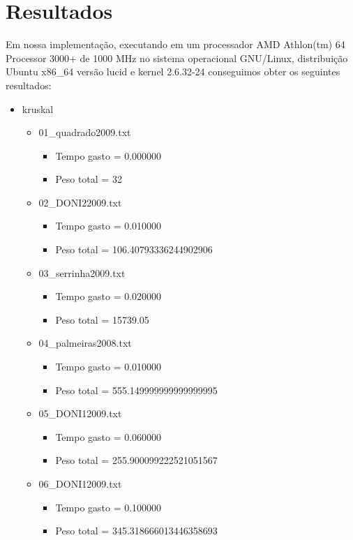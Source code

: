\documentclass[12pt,a4paper]{article}
\begin{document}
\section{Resultados}

Em nossa implementação, executando em um processador AMD Athlon(tm) 64 Processor
3000+ de 1000 MHz no sistema operacional GNU/Linux, distribuição Ubuntu x86\_64
versão lucid e kernel 2.6.32-24 conseguimos obter os seguintes resultados:

\begin{itemize}
\item kruskal
\begin{itemize}
\item 01\_quadrado2009.txt
\begin{itemize}
\item Tempo gasto = 0.000000 
\item Peso total = 32
\end{itemize}
\item 02\_DONI22009.txt
\begin{itemize}
\item Tempo gasto = 0.010000 
\item Peso total = 106.40793336244902906 
\end{itemize}
\item 03\_serrinha2009.txt
\begin{itemize}
\item Tempo gasto = 0.020000 
\item Peso total = 15739.05 
\end{itemize}
\item 04\_palmeiras2008.txt
\begin{itemize}
\item Tempo gasto = 0.010000 
\item Peso total = 555.149999999999999995 
\end{itemize}
\item 05\_DONI12009.txt
\begin{itemize}
\item Tempo gasto = 0.060000 
\item Peso total = 255.900099222521051567 
\end{itemize}
\item 06\_DONI12009.txt
\begin{itemize}
\item Tempo gasto = 0.100000 
\item Peso total = 345.318666013446358693 
\end{itemize}

\end{itemize}
\end{itemize}
\end{document}
